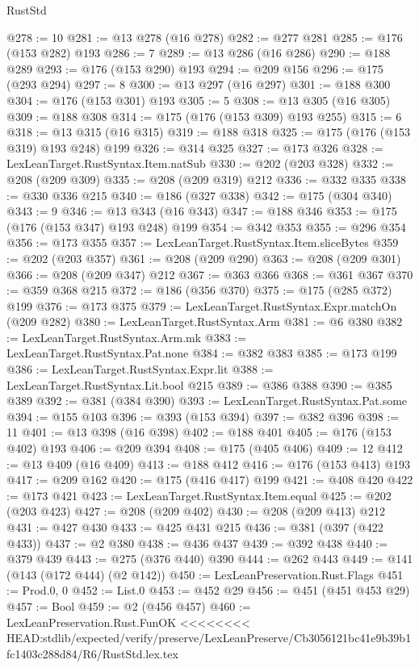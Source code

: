 \begin{lexlean}{RustStd}
\begin{coremodule}
{\begin{coremodule}
{{{{{@278 := 10
@281 := @13 @278 (@16 @278)
@282 := @277 @281
@285 := @176 (@153 @282) @193
@286 := 7
@289 := @13 @286 (@16 @286)
@290 := @188 @289
@293 := @176 (@153 @290) @193
@294 := @209 @156
@296 := @175 (@293 @294)
@297 := 8
@300 := @13 @297 (@16 @297)
@301 := @188 @300
@304 := @176 (@153 @301) @193
@305 := 5
@308 := @13 @305 (@16 @305)
@309 := @188 @308
@314 := @175 (@176 (@153 @309) @193 @255)
@315 := 6
@318 := @13 @315 (@16 @315)
@319 := @188 @318
@325 := @175 (@176 (@153 @319) @193 @248) @199
@326 := @314 @325
@327 := @173 @326
@328 := LexLeanTarget.RustSyntax.Item.natSub
@330 := @202 (@203 @328)
@332 := @208 (@209 @309)
@335 := @208 (@209 @319) @212
@336 := @332 @335
@338 := @330 @336 @215
@340 := @186 (@327 @338)
@342 := @175 (@304 @340)
@343 := 9
@346 := @13 @343 (@16 @343)
@347 := @188 @346
@353 := @175 (@176 (@153 @347) @193 @248) @199
@354 := @342 @353
@355 := @296 @354
@356 := @173 @355
@357 := LexLeanTarget.RustSyntax.Item.sliceBytes
@359 := @202 (@203 @357)
@361 := @208 (@209 @290)
@363 := @208 (@209 @301)
@366 := @208 (@209 @347) @212
@367 := @363 @366
@368 := @361 @367
@370 := @359 @368 @215
@372 := @186 (@356 @370)
@375 := @175 (@285 @372) @199
@376 := @173 @375
@379 := LexLeanTarget.RustSyntax.Expr.matchOn (@209 @282)
@380 := LexLeanTarget.RustSyntax.Arm
@381 := @6 @380
@382 := LexLeanTarget.RustSyntax.Arm.mk
@383 := LexLeanTarget.RustSyntax.Pat.none
@384 := @382 @383
@385 := @173 @199
@386 := LexLeanTarget.RustSyntax.Expr.lit
@388 := LexLeanTarget.RustSyntax.Lit.bool @215
@389 := @386 @388
@390 := @385 @389
@392 := @381 (@384 @390)
@393 := LexLeanTarget.RustSyntax.Pat.some
@394 := @155 @103
@396 := @393 (@153 @394)
@397 := @382 @396
@398 := 11
@401 := @13 @398 (@16 @398)
@402 := @188 @401
@405 := @176 (@153 @402) @193
@406 := @209 @394
@408 := @175 (@405 @406)
@409 := 12
@412 := @13 @409 (@16 @409)
@413 := @188 @412
@416 := @176 (@153 @413) @193
@417 := @209 @162
@420 := @175 (@416 @417) @199
@421 := @408 @420
@422 := @173 @421
@423 := LexLeanTarget.RustSyntax.Item.equal
@425 := @202 (@203 @423)
@427 := @208 (@209 @402)
@430 := @208 (@209 @413) @212
@431 := @427 @430
@433 := @425 @431 @215
@436 := @381 (@397 (@422 @433))
@437 := @2 @380
@438 := @436 @437
@439 := @392 @438
@440 := @379 @439
@443 := @275 (@376 @440) @390
@444 := @262 @443
@449 := @141 (@143 (@172 @444) (@2 @142))
@450 := LexLeanPreservation.Rust.Flags
@451 := Prod.{0, 0}
@452 := List.{0}
@453 := @452 @29
@456 := @451 (@451 @453 @29)
@457 := Bool
@459 := @2 (@456 @457)
@460 := LexLeanPreservation.Rust.FunOK
<<<<<<<< HEAD:stdlib/expected/verify/preserve/LexLeanPreserve/Cb3056121bc41e9b39b1fc1403c288d84/R6/RustStd.lex.tex
}}}}}
\end{coremodule}}
\end{coremodule}
\end{lexlean}
